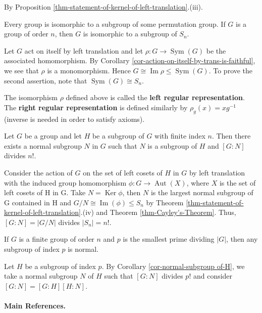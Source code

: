 \begin{sketch}
	By Proposition \ref{thm-statement-of-kernel-of-left-translation}.(iii).
\end{sketch}
\begin{theorem} \label{thm-Cayley's-Theorem}
	Every group is isomorphic to a subgroup of some permutation group. If $G$ is a group of order $n$, then $G$ is isomorphic to a subgroup of $S_n$.
\end{theorem}
\begin{sketch}
	Let $G$ act on itself by left translation and let $\rho:G\rightarrow \operatorname{Sym}(G)$ be the associated homomorphism. By Corollary \ref{cor-action-on-itself-by-trans-is-faithful}, we see that $\rho$ is a monomorphism. Hence $G\cong \operatorname{Im}\rho \leq \operatorname{Sym}(G)$. To prove the second assertion, note that $\operatorname{Sym}(G) \cong S_n$.
\end{sketch}
\begin{definition}
	The isomorphism $\rho$ defined above is called the \textbf{left regular representation}. The \textbf{right regular representation} is defined similarly by $\rho_g(x) = xg^{-1}$ (inverse is needed in order to satisfy axioms). 
\end{definition}
\begin{corollary}\label{cor-normal-subgroup of-H}
	Let $G$ be a group and let $H$ be a subgroup of $G$ with finite index $n$. Then there exists a normal subgroup $N$ in $G$ such that $N$ is a subgroup of $H$ and $[G:N]$ divides $n!$.
\end{corollary}
\begin{sketch}
	Consider the action of $G$ on the set of left cosets of $H$ in $G$ by left translation with the induced group homomorphism $\phi : G \rightarrow \operatorname{Aut}(X)$, where $X$ is the set of left cosets of H in G. Take $N = \operatorname{Ker}\phi$, then $N$ is the largest normal subgroup of G contained in H and $G/N \cong \operatorname{Im}(\phi) \leq S_n$ by Theorem \ref{thm-statement-of-kernel-of-left-translation}.(iv) and Theorem \ref{thm-Cayley's-Theorem}. Thus, $[G:N] = |G/N|$ divides $|S_n| = n!$.
\end{sketch}
\begin{corollary}
	If $G$ is a finite group of order $n$ and $p$ is the smallest prime dividing $|G|$,
	then any subgroup of index $p$ is normal.
\end{corollary}
\begin{sketch}
	Let $H$ be a subgroup of index $p$. By Corollary \ref{cor-normal-subgroup of-H}, we take a normal subgroup $N$ of $H$ such that $[G:N]$ divides $p!$ and consider $[G:N] = [G:H][H:N]$.
\end{sketch}

\paragraph{Main References.} \cite{DummitFoote2004,Rotman1995,Hungerford1974,Isaacs2009}


